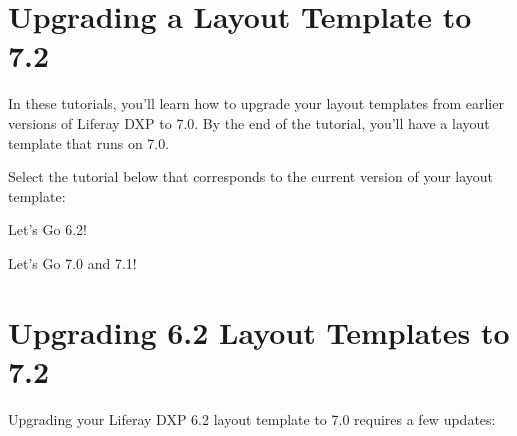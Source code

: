 \chapter{Upgrading a Layout Template to
7.2}\label{upgrading-a-layout-template-to-7.2}

In these tutorials, you'll learn how to upgrade your layout templates
from earlier versions of Liferay DXP to 7.0. By the end of the tutorial,
you'll have a layout template that runs on 7.0.

Select the tutorial below that corresponds to the current version of
your layout template:

Let's Go 6.2!{}

Let's Go 7.0 and 7.1!{}

\chapter{Upgrading 6.2 Layout Templates to
7.2}\label{upgrading-6.2-layout-templates-to-7.2}

Upgrading your Liferay DXP 6.2 layout template to 7.0 requires a few
updates:


